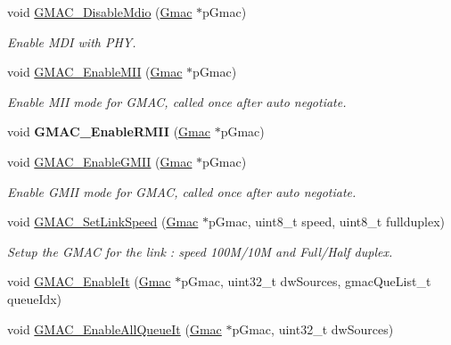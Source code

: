 \begin{DoxyCompactItemize}
void \mbox{\hyperlink{group__gmac__defines_ga6013c7006f83c59d4895a92e3f473804}{G\+M\+A\+C\+\_\+\+Disable\+Mdio}} (\mbox{\hyperlink{structGmac}{Gmac}} $\ast$p\+Gmac)
\begin{DoxyCompactList}\small\item\em Enable M\+DI with P\+HY. \end{DoxyCompactList}\item 
void \mbox{\hyperlink{group__gmac__defines_ga1c7cb7972602f58f16fc89bcaf542107}{G\+M\+A\+C\+\_\+\+Enable\+M\+II}} (\mbox{\hyperlink{structGmac}{Gmac}} $\ast$p\+Gmac)
\begin{DoxyCompactList}\small\item\em Enable M\+II mode for G\+M\+AC, called once after auto negotiate. \end{DoxyCompactList}\item 
\mbox{\label{group__gmac__defines_gad72c02fbc8a87e268f39b6f53b342807}} 
void {\bfseries G\+M\+A\+C\+\_\+\+Enable\+R\+M\+II} (\mbox{\hyperlink{structGmac}{Gmac}} $\ast$p\+Gmac)
\item 
void \mbox{\hyperlink{group__gmac__defines_ga7fe750f0610e329ea954e40313a59697}{G\+M\+A\+C\+\_\+\+Enable\+G\+M\+II}} (\mbox{\hyperlink{structGmac}{Gmac}} $\ast$p\+Gmac)
\begin{DoxyCompactList}\small\item\em Enable G\+M\+II mode for G\+M\+AC, called once after auto negotiate. \end{DoxyCompactList}\item 
void \mbox{\hyperlink{group__gmac__defines_gac44f47e8f63b8c48075840b81c7ca823}{G\+M\+A\+C\+\_\+\+Set\+Link\+Speed}} (\mbox{\hyperlink{structGmac}{Gmac}} $\ast$p\+Gmac, uint8\+\_\+t speed, uint8\+\_\+t fullduplex)
\begin{DoxyCompactList}\small\item\em Setup the G\+M\+AC for the link \+: speed 100M/10M and Full/\+Half duplex. \end{DoxyCompactList}\item 
void \mbox{\hyperlink{group__gmac__defines_ga7ada4663e83402d9ca6da62f166e115f}{G\+M\+A\+C\+\_\+\+Enable\+It}} (\mbox{\hyperlink{structGmac}{Gmac}} $\ast$p\+Gmac, uint32\+\_\+t dw\+Sources, gmac\+Que\+List\+\_\+t queue\+Idx)
\item 
void \mbox{\hyperlink{group__gmac__defines_ga9de1f2c0ddd04e5a49f6a568b62828b5}{G\+M\+A\+C\+\_\+\+Enable\+All\+Queue\+It}} (\mbox{\hyperlink{structGmac}{Gmac}} $\ast$p\+Gmac, uint32\+\_\+t dw\+Sources)

\end{DoxyCompactItemize}
